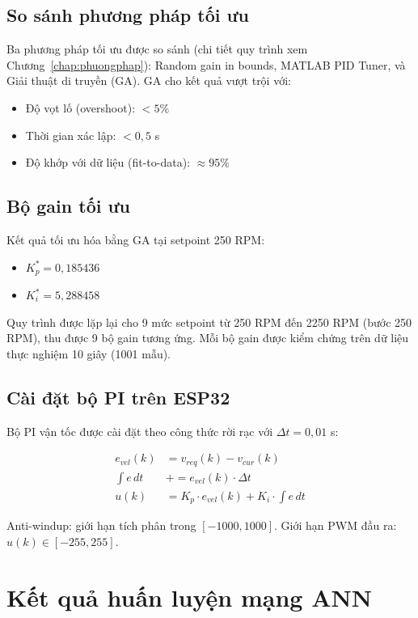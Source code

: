 \subsection{So sánh phương pháp tối ưu}

Ba phương pháp tối ưu được so sánh (chi tiết quy trình xem Chương~\ref{chap:phuongphap}):
Random gain in bounds, MATLAB PID Tuner, và Giải thuật di truyền (GA).
GA cho kết quả vượt trội với:
\begin{itemize}
    \item Độ vọt lố (overshoot): $< 5\%$
    \item Thời gian xác lập: $< 0{,}5$ s
    \item Độ khớp với dữ liệu (fit-to-data): $\approx 95\%$
\end{itemize}

\subsection{Bộ gain tối ưu}

Kết quả tối ưu hóa bằng GA tại setpoint 250 RPM:
\begin{itemize}
    \item $K_p^* = 0{,}185436$
    \item $K_i^* = 5{,}288458$
\end{itemize}

Quy trình được lặp lại cho 9 mức setpoint từ 250 RPM đến 2250 RPM (bước 250 RPM),
thu được 9 bộ gain tương ứng. Mỗi bộ gain được kiểm chứng trên dữ liệu thực
nghiệm 10 giây (1001 mẫu).

\subsection{Cài đặt bộ PI trên ESP32}

Bộ PI vận tốc được cài đặt theo công thức rời rạc với $\Delta t = 0{,}01$ s:

\begin{align}
    e_{vel}(k) &= v_{req}(k) - v_{cur}(k) \\
    \int e\,dt &\mathrel{+}= e_{vel}(k) \cdot \Delta t \\
    u(k) &= K_p \cdot e_{vel}(k) + K_i \cdot \int e\,dt
\end{align}

Anti-windup: giới hạn tích phân trong $[-1000, 1000]$.
Giới hạn PWM đầu ra: $u(k) \in [-255, 255]$.


\section{Kết quả huấn luyện mạng ANN}

